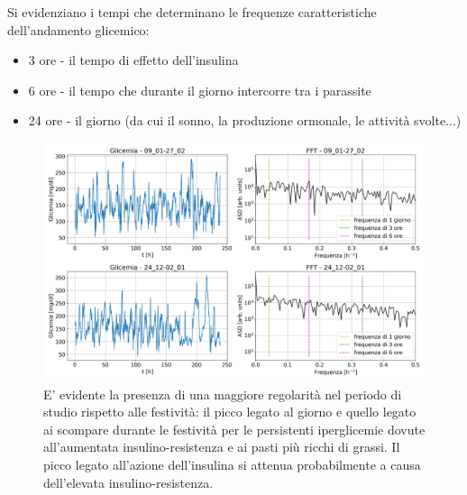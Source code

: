\documentclass{article}
\begin{document}
        Si evidenziano i tempi che determinano le frequenze caratteristiche dell'andamento glicemico:
            \begin{itemize}
                \item 3 ore - il tempo di effetto dell'insulina
                \item 6 ore - il tempo che durante il giorno intercorre tra i parassite
                \item 24 ore - il giorno (da cui il sonno, la produzione ormonale, le attività
                svolte...)
            \end{itemize}
            \begin{figure}[H]
                \centering
                \includegraphics[width=\textwidth]{rubbish/rubbish.png}
                \caption{E' evidente la presenza di una maggiore regolarità nel 
                periodo di studio rispetto alle festività: il picco legato
                al giorno e quello legato ai scompare durante le festività 
                per le persistenti iperglicemie dovute all'aumentata insulino-resistenza e ai pasti più ricchi di grassi.
                Il picco legato all'azione dell'insulina si attenua probabilmente
                a causa dell'elevata insulino-resistenza.}
                \label{fig:rubbish}
            \end{figure} 
\end{document}
